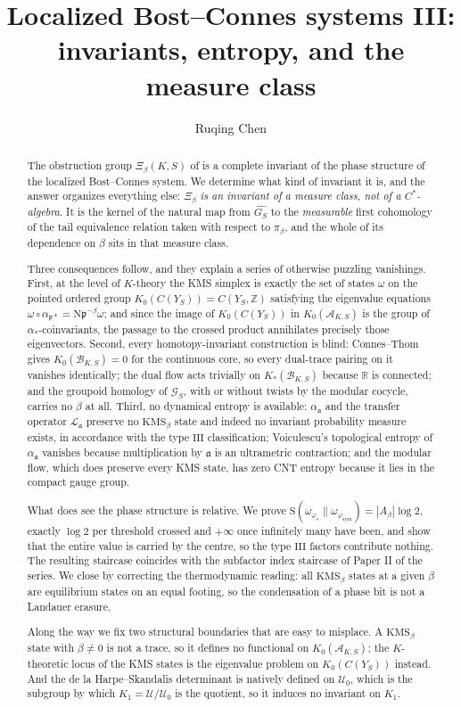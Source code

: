 \documentclass[11pt]{amsart}
\title[Invariants, entropy, and the measure class]{Localized Bost--Connes systems III:\\ invariants, entropy, and the measure class}
\author{Ruqing Chen}
\date{}
\numberwithin{equation}{section}
\theoremstyle{definition}
\theoremstyle{remark}
\newcommand{\Z}{\mathbb{Z}}
\newcommand{\R}{\mathbb{R}}
\newcommand{\cA}{\mathcal{A}}
\newcommand{\cB}{\mathcal{B}}
\newcommand{\cG}{\mathcal{G}}
\newcommand{\cL}{\mathcal{L}}
\newcommand{\cU}{\mathcal{U}}
\newcommand{\pp}{\mathfrak{p}}
\newcommand{\aaa}{\mathfrak{a}}
\newcommand{\Ns}{\mathrm{N}}
\newcommand{\Ent}{\mathrm{S}}
\newcommand{\phisym}{\varphi_{\mathrm{sym}}}
\begin{document}
\begin{abstract}
The obstruction group $\Xi_\beta(K,S)$ of \cite{Main} is a complete invariant of the phase
structure of the localized Bost--Connes system. We determine what kind of invariant it is,
and the answer organizes everything else: \emph{$\Xi_\beta$ is an invariant of a measure
class, not of a $C^*$-algebra}. It is the kernel of the natural map from $\widehat{G_S}$ to
the \emph{measurable} first cohomology of the tail equivalence relation taken with respect
to $\pi_\beta$, and the whole of its dependence on $\beta$ sits in that measure class.

Three consequences follow, and they explain a series of otherwise puzzling vanishings.
First, at the level of $K$-theory the KMS simplex is exactly the set of states $\omega$ on
the pointed ordered group $K_0(C(Y_S))=C(Y_S,\Z)$ satisfying the eigenvalue equations
$\omega\circ\alpha_{\pp*}=\Ns\pp^{-\beta}\omega$; and since the image of
$K_0(C(Y_S))$ in $K_0(\cA_{K,S})$ is the group of $\alpha_*$-coinvariants, the passage to
the crossed product annihilates precisely those eigenvectors. Second, every homotopy-invariant construction is blind:
Connes--Thom gives $K_0(\cB_{K,S})=0$ for the continuous core, so every dual-trace pairing
on it vanishes identically; the dual flow acts trivially on $K_*(\cB_{K,S})$ because $\R$ is
connected; and the groupoid homology of $\cG_S$, with or without twists by the modular
cocycle, carries no $\beta$ at all. Third, no dynamical entropy is available:
$\alpha_\aaa$ and the transfer operator $\cL_\aaa$ preserve no $\mathrm{KMS}_\beta$ state
and indeed no invariant probability measure exists, in accordance with the type
$\mathrm{III}$ classification; Voiculescu's topological entropy of $\alpha_\aaa$ vanishes
because multiplication by $\aaa$ is an ultrametric contraction; and the modular flow, which
does preserve every KMS state, has zero CNT entropy because it lies in the compact gauge
group.

What does see the phase structure is relative. We prove
$\Ent(\omega_{\varphi_\varepsilon}\|\omega_{\phisym})=|A_\beta|\log2$, exactly $\log2$ per
threshold crossed and $+\infty$ once infinitely many have been, and show that the entire
value is carried by the centre, so the type $\mathrm{III}$ factors contribute nothing. The
resulting staircase coincides with the subfactor index staircase of Paper II of the series.
We close by correcting the thermodynamic reading: all $\mathrm{KMS}_\beta$ states at a given
$\beta$ are equilibrium states on an equal footing, so the condensation of a phase bit is
not a Landauer erasure.

Along the way we fix two structural boundaries that are easy to misplace. A
$\mathrm{KMS}_\beta$ state with $\beta\ne0$ is not a trace, so it defines no functional on
$K_0(\cA_{K,S})$; the $K$-theoretic locus of the KMS states is the eigenvalue problem on
$K_0(C(Y_S))$ instead. And the de la Harpe--Skandalis determinant is natively defined on
$\cU_0$, which is the subgroup by which $K_1=\cU/\cU_0$ is the quotient, so it induces no
invariant on $K_1$.
\end{abstract}
\end{document}
